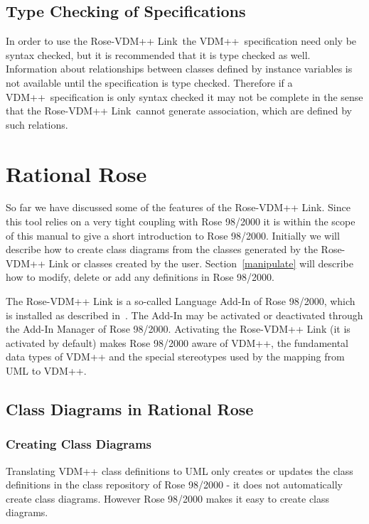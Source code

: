 \documentclass[\pformat,12pt]{article}
\newcommand{\vdmpp}{VDM++}
\newcommand{\link}{Rose-\vdmpp{} Link}
\newcommand{\rose}{Rose 98/2000}
\begin{document}
\subsection{Type Checking of Specifications}
\label{sec:typecheck}

In order to use the \link\ the \vdmpp\ specification need only be
syntax checked, but it is recommended that it is type checked as well.
Information about relationships between classes defined by instance
variables is not available until the specification is type checked.
Therefore if a \vdmpp\ specification is only syntax checked it may not
be complete in the sense that the \link\ cannot generate association,
which are defined by such relations.

\newpage  
\section{Rational Rose}
\label{rose98}
  
So far we have discussed some of the features of the \link{}. Since
this tool relies on a very tight coupling with \rose{} it is within
the scope of this manual to give a short introduction to \rose{}.
Initially we will describe how to create class diagrams from the
classes generated by the \link{} or classes created by the user.
Section~\ref{manipulate} will describe how to modify, delete or add
any definitions in \rose{}.  

The \link{} is a so-called Language Add-In of \rose{}, which is
installed as described in~\cite{InstallPPMan-CSK}. The Add-In may be
activated or deactivated through the Add-In Manager of \rose{}.
Activating the \link{} (it is activated by default) makes \rose{}
aware of \vdmpp{}, the fundamental data types of \vdmpp{} and the
special stereotypes used by the mapping from UML to \vdmpp{}.

\subsection{Class Diagrams in Rational Rose}
\label{diagrams}
  
\subsubsection*{Creating Class Diagrams}

Translating \vdmpp{} class definitions to UML only creates or updates the class definitions   
in the class repository of \rose{} - it does not automatically create class diagrams. 
However \rose{} makes it easy to create class diagrams.
  
\end{document}
